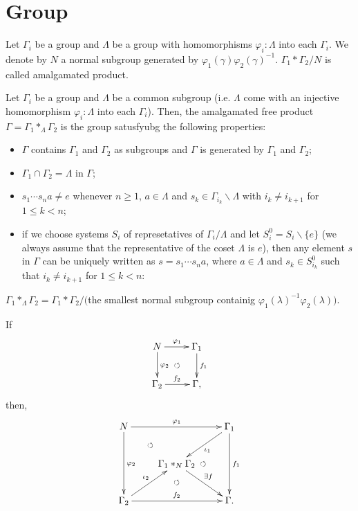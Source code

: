 \section{Group}

\begin{definition}
  Let $\Gamma_i$ be a group and $\Lambda$ be a group with homomorphisms $\varphi_i:\Lambda$ into each $\Gamma_i$.
  We denote by $N$ a normal subgroup generated by $\varphi_1(\gamma) \varphi_2(\gamma)^{-1}$.
  $\Gamma_1 * \Gamma_2 / N$ is called amalgamated product.
\end{definition}

\begin{definition}\label{amalgam}
  Let $\Gamma_i$ be a group and $\Lambda$ be a common subgroup (i.e. $\Lambda$ come with an injective homomorphism $\varphi_i :\Lambda$ into each $\Gamma_i$).
  Then, the amalgamated free product $\Gamma = \Gamma_1 *_{\Lambda} \Gamma_2$ is the group satusfyubg the following properties:
  \begin{itemize}
    \item $\Gamma$ contains $\Gamma_1$ and $\Gamma_2$ as subgroups and $\Gamma$ is generated by $\Gamma_1$ and $\Gamma_2$;
    \item $\Gamma_1 \cap \Gamma_2 = \Lambda$ in $\Gamma$;
    \item $s_1 \cdots s_n a \neq e $ whenever $n \geq 1$, $a \in \Lambda$ and $s_k \in \Gamma_{i_k}\backslash \Lambda$ with $i_k \neq i_{k+1}$ for $1 \leq k < n$;
    \item if we choose systems $S_i$ of represetatives of $\Gamma_i/\Lambda$ and let $S_i^0 = S_i \backslash \{e\}$ (we always assume that the representative of the coset $\Lambda$ is $e$), then any element $s$ in $\Gamma$ can be uniquely written as $s =s_1 \cdots s_na$, where $a \in \Lambda$ and $s_k \in S_{i_k}^0$ such that $i_k \neq i_{k+1}$ for $1 \leq k < n$:
  \end{itemize}
  
\end{definition}

\begin{remark}
  $\Gamma_1 *_{\Lambda} \Gamma_2 = \Gamma_1*\Gamma_2/($the smallest normal subgroup containig $\varphi_1(\lambda)^{-1}\varphi_2(\lambda))$.
\end{remark}

\begin{remark}[universality]
  If
  \[
  \xymatrix{
    N \ar[r]^{\varphi_1} \ar[d]^{\varphi_2} \ar@{}[dr]|\circlearrowleft& \Gamma_1 \ar[d]^{f_1} \\
    \Gamma_2 \ar[r]^{f_2} & \Gamma ,
  }
  \]
  then,
  \[
  \xymatrix{
    N \ar[rr]^{\varphi_1} \ar[dd]^{\varphi_2} \ar@{}[dr]|\circlearrowleft& & \Gamma_1 \ar[dd]^{f_1} \ar[dl]^{\iota_1} \\
    & \Gamma_1 *_N \Gamma_2 \ar[dr]^{ \exists f} \ar@{}[d]|\circlearrowleft \ar@{}[r]|\circlearrowleft&\\
    \Gamma_2 \ar[rr]^{f_2} \ar[ru]^{\iota_2} & & \Gamma .
  }
  \]
\end{remark}


